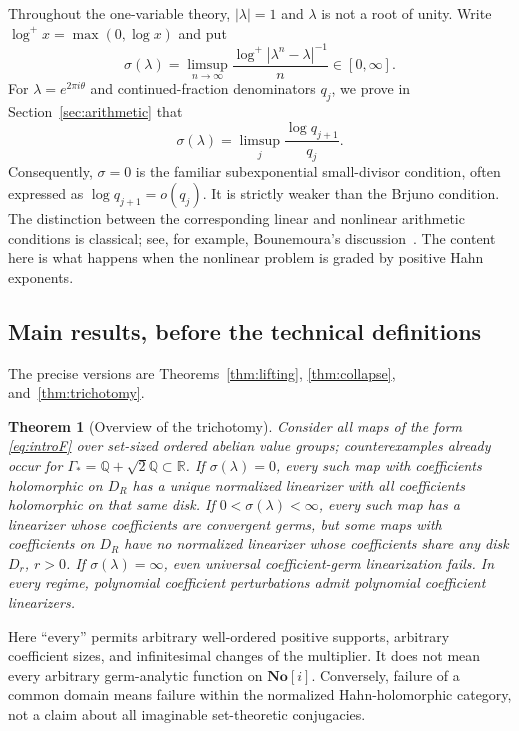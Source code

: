 \documentclass[11pt,a4paper]{article}
\numberwithin{equation}{section}
\newtheorem{theorem}{Theorem}[section]
\theoremstyle{definition}
\theoremstyle{remark}
\newcommand{\R}{\mathbb R}
\newcommand{\Q}{\mathbb Q}
\newcommand{\No}{\mathbf{No}}
\newcommand{\Gstar}{\Gamma_*}
\begin{document}
Throughout the one-variable theory, $|\lambda|=1$ and $\lambda$ is not a root
of unity. Write $\log^+x=\max(0,\log x)$ and put
\begin{equation}\label{eq:sigma}
 \sigma(\lambda)=\limsup_{n\to\infty}
 \frac{\log^+|\lambda^n-\lambda|^{-1}}{n}\in[0,\infty].
\end{equation}
For $\lambda=e^{2\pi i\theta}$ and continued-fraction denominators $q_j$,
we prove in Section~\ref{sec:arithmetic} that
\begin{equation}\label{eq:sigmaqintro}
 \sigma(\lambda)=\limsup_j\frac{\log q_{j+1}}{q_j}.
\end{equation}
Consequently, $\sigma=0$ is the familiar subexponential small-divisor
condition, often expressed as $\log q_{j+1}=o(q_j)$. It is strictly weaker
than the Brjuno condition. The distinction between the corresponding linear
and nonlinear arithmetic conditions is classical; see, for example,
Bounemoura's discussion~\cite{Bounemoura}. The content here is what happens
when the nonlinear problem is graded by positive Hahn exponents.

\subsection{Main results, before the technical definitions}

The precise versions are Theorems~\ref{thm:lifting},
\ref{thm:collapse}, and~\ref{thm:trichotomy}.

\begin{theorem}[Overview of the trichotomy]\label{thm:overview}
Consider all maps of the form \eqref{eq:introF} over set-sized ordered
abelian value groups; counterexamples already occur for
$\Gstar=\Q+\sqrt2\Q\subset\R$.
If $\sigma(\lambda)=0$, every such map with coefficients holomorphic on
$D_R$ has a unique normalized linearizer with all coefficients holomorphic
on that same disk. If $0<\sigma(\lambda)<\infty$, every such map has a
linearizer whose coefficients are convergent germs, but some maps with
coefficients on $D_R$ have no normalized linearizer whose coefficients share
any disk $D_r$, $r>0$. If $\sigma(\lambda)=\infty$, even universal
coefficient-germ linearization fails.
In every regime, polynomial coefficient perturbations admit polynomial
coefficient linearizers.
\end{theorem}

Here ``every'' permits arbitrary well-ordered positive supports, arbitrary
coefficient sizes, and infinitesimal changes of the multiplier. It does not
mean every arbitrary germ-analytic function on $\No[i]$. Conversely, failure
of a common domain means failure within the normalized Hahn-holomorphic
category, not a claim about all imaginable set-theoretic conjugacies.
\end{document}
